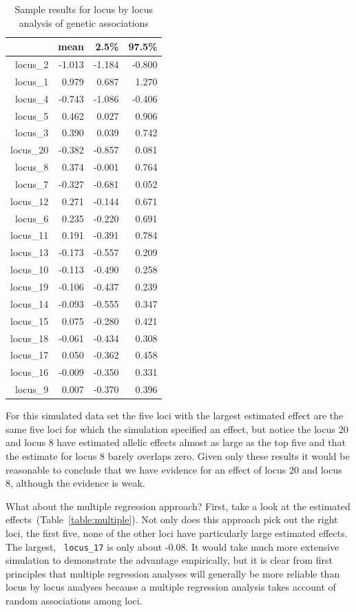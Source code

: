 \documentclass[12pt]{article}
\begin{document}
\begin{table}
  \centering
\begin{tabular}{rrrr}
  \hline
 & mean & 2.5\% & 97.5\% \\ 
  \hline
locus\_2 & -1.013 & -1.184 & -0.800 \\ 
locus\_1 & 0.979 & 0.687 & 1.270 \\ 
locus\_4 & -0.743 & -1.086 & -0.406 \\ 
locus\_5 & 0.462 & 0.027 & 0.906 \\ 
locus\_3 & 0.390 & 0.039 & 0.742 \\ 
locus\_20 & -0.382 & -0.857 & 0.081 \\ 
locus\_8 & 0.374 & -0.001 & 0.764 \\ 
locus\_7 & -0.327 & -0.681 & 0.052 \\ 
locus\_12 & 0.271 & -0.144 & 0.671 \\ 
locus\_6 & 0.235 & -0.220 & 0.691 \\
locus\_11 & 0.191 & -0.391 & 0.784 \\ 
locus\_13 & -0.173 & -0.557 & 0.209 \\ 
locus\_10 & -0.113 & -0.490 & 0.258 \\ 
locus\_19 & -0.106 & -0.437 & 0.239 \\ 
locus\_14 & -0.093 & -0.555 & 0.347 \\ 
locus\_15 & 0.075 & -0.280 & 0.421 \\ 
locus\_18 & -0.061 & -0.434 & 0.308 \\ 
locus\_17 & 0.050 & -0.362 & 0.458 \\ 
locus\_16 & -0.009 & -0.350 & 0.331 \\ 
locus\_9 & 0.007 & -0.370 & 0.396 \\
  \hline
\end{tabular}
\caption{Sample results for locus by locus analysis of genetic
  associations}\label{table:single}
\end{table}

For this simulated data set the five loci with the largest estimated
effect are the same five loci for which the simulation specified an
effect, but notice the locus 20 and locus 8 have estimated allelic
effects almost as large as the top five and that the estimate for
locus 8 barely overlaps zero. Given only these results it would be
reasonable to conclude that we have evidence for an effect of locus 20
and locus 8, although the evidence is weak. 

What about the multiple regression approach? First, take a look at the
estimated effects~(Table~\ref{table:multiple}). Not only does this
approach pick out the right loci, the first five, none of the other
loci have particularly large estimated effects. The largest, {\tt
  locus\_17} is only about -0.08. It would take much more extensive
simulation to demonstrate the advantage empirically, but it is clear
from first principles that multiple regression analyses will generally
be more reliable than locus by locus analyses because a multiple
regression analysis takes account of random associations among loci.
\end{document}
